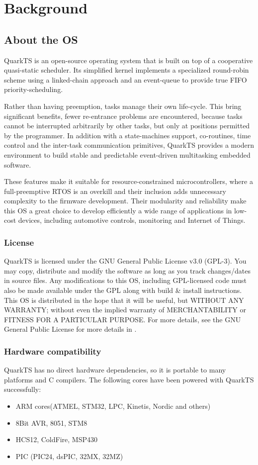 \section{Background}
\subsection{About the OS}
QuarkTS is an open-source operating system that is built on top of a cooperative quasi-static scheduler. Its simplified kernel implements a specialized round-robin scheme using a linked-chain approach and an event-queue to provide true FIFO priority-scheduling.

Rather than having preemption,  tasks manage their own life-cycle. This bring significant benefits, fewer re-entrance problems are encountered, because tasks cannot be interrupted arbitrarily by other tasks, but only at positions permitted by the programmer. In addition with a state-machines support, co-routines, time control and the inter-task communication primitives, QuarkTS provides a modern environment to build stable and predictable event-driven multitasking embedded software.

These features make it suitable for resource-constrained microcontrollers, where a full-preemptive RTOS is an overkill and their inclusion adds unnecessary complexity to the firmware development. Their modularity and reliability make this OS a great choice to develop efficiently a wide range of applications in low-cost devices, including automotive controls, monitoring and Internet of Things.

\subsubsection{License}
QuarkTS is licensed under the GNU General Public License v3.0 (GPL-3). You may copy, distribute and modify the software as long as you track changes/dates in source files. Any modifications to this OS, including GPL-licensed code must also be made available under the GPL along with build \& install instructions. This OS is distributed in the hope that it will be useful, but WITHOUT ANY WARRANTY; without even the implied warranty of MERCHANTABILITY or FITNESS FOR A PARTICULAR PURPOSE. 
For more details, see the GNU General Public License for more details in \cite{license}. 

\subsubsection{Hardware compatibility}
QuarkTS has no direct hardware dependencies, so it is portable to many platforms and C compilers. 
The following cores have been powered with QuarkTS successfully:
\begin{itemize}
    \item ARM cores(ATMEL, STM32, LPC, Kinetis, Nordic and others)
    \item 8Bit AVR, 8051, STM8
    \item HCS12, ColdFire, MSP430
    \item PIC (PIC24, dsPIC, 32MX, 32MZ)
\end{itemize}

